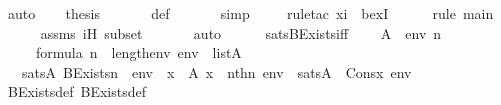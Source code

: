 \begin{isabellebody}
\ auto\isanewline
\isanewline
\ \ \isamarkupfalse%
\ {\isacharquery}{\kern0pt}thesis\ \isanewline
\ \ \ \ \isamarkupfalse%
\ {\isasymDelta}{}{\isacharunderscore}{\kern0pt}def\ \isanewline
\ \ \ \ \isamarkupfalse%
\ simp\isanewline
\ \ \ \ \isamarkupfalse%
{\isacharparenleft}{\kern0pt}rule{\isacharunderscore}{\kern0pt}tac\ x{\isacharequal}{\kern0pt}i\ \ bexI{\isacharparenright}{\kern0pt}\isanewline
\ \ \ \ \ \isamarkupfalse%
{\isacharparenleft}{\kern0pt}rule\ main{\isacharparenright}{\kern0pt}\isanewline
\ \ \ \ \isamarkupfalse%
\ assms\ iH\ {\isasymDelta}{}{\isacharunderscore}{\kern0pt}subset\ \isanewline
\ \ \ \ \isamarkupfalse%
\ auto\isanewline
\ \ \ \ \isamarkupfalse%
\isanewline
{}\isamarkupfalse%
%
\endisatagproof
{\isafoldproof}%
%
\isadelimproof
\isanewline
%
\endisadelimproof
\isanewline
{}\isamarkupfalse%
\ sats{\isacharunderscore}{\kern0pt}BExists{\isacharunderscore}{\kern0pt}iff\ {\isacharcolon}{\kern0pt}\isanewline
\ \ \ A\ {\isasymphi}\ env\ n\ \isanewline
\ \ \ {\isachardoublequoteopen}{\isasymphi}\ {\isasymin}\ formula{\isachardoublequoteclose}\ {\isachardoublequoteopen}n\ {\isacharless}{\kern0pt}\ length{\isacharparenleft}{\kern0pt}env{\isacharparenright}{\kern0pt}{\isachardoublequoteclose}\ {\isachardoublequoteopen}env\ {\isasymin}\ list{\isacharparenleft}{\kern0pt}A{\isacharparenright}{\kern0pt}{\isachardoublequoteclose}\ \isanewline
\ \ \ {\isachardoublequoteopen}sats{\isacharparenleft}{\kern0pt}A{\isacharcomma}{\kern0pt}\ BExists{\isacharparenleft}{\kern0pt}n{\isacharcomma}{\kern0pt}\ {\isasymphi}{\isacharparenright}{\kern0pt}{\isacharcomma}{\kern0pt}\ env{\isacharparenright}{\kern0pt}\ {\isasymlongleftrightarrow}\ {\isacharparenleft}{\kern0pt}{\isasymexists}x\ {\isasymin}\ A{\isachardot}{\kern0pt}\ x\ {\isasymin}\ nth{\isacharparenleft}{\kern0pt}n{\isacharcomma}{\kern0pt}\ env{\isacharparenright}{\kern0pt}\ {\isasymand}\ sats{\isacharparenleft}{\kern0pt}A{\isacharcomma}{\kern0pt}\ {\isasymphi}{\isacharcomma}{\kern0pt}\ Cons{\isacharparenleft}{\kern0pt}x{\isacharcomma}{\kern0pt}\ env{\isacharparenright}{\kern0pt}{\isacharparenright}{\kern0pt}{\isacharparenright}{\kern0pt}{\isachardoublequoteclose}\ \isanewline
%
\isadelimproof
\ \ %
\endisadelimproof
%
\isatagproof
{}\isamarkupfalse%
\ BExists{\isacharunderscore}{\kern0pt}def\ BExists{\isacharprime}{\kern0pt}{\isacharunderscore}{\kern0pt}def\ \isanewline

\end{isabellebody}
